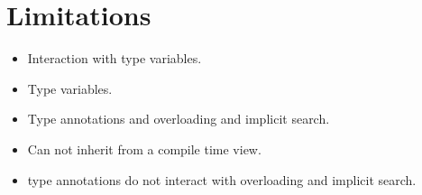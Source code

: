 \section{Limitations}
\label{sct:limitations}

\begin{itemize}
\item Interaction with type variables.
\item Type variables.
\item Type annotations and overloading and implicit search.
\item Can not inherit from a compile time view.
\item type annotations do not interact with overloading and implicit search.
\end{itemize}
